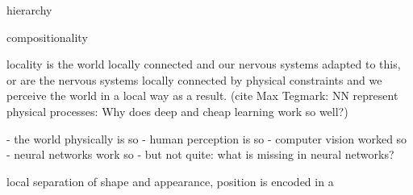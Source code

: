 hierarchy


compositionality


locality
is the world locally connected and our nervous systems adapted to this, or are the nervous systems locally connected by physical constraints and we perceive the world in a local way as a result. (cite Max Tegmark: NN represent physical processes: Why does deep and cheap learning work so well?)


- the world physically is so
- human perception is so
- computer vision worked so
- neural networks work so
- but not quite: what is missing in neural networks?

local separation of shape and appearance, position is encoded in a
